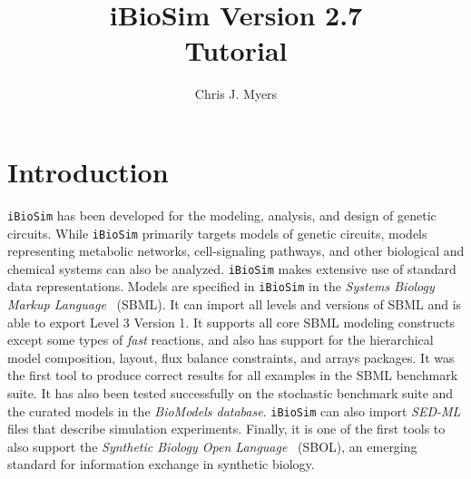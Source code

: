 \documentclass[titlepage,11pt]{article}
\title{iBioSim Version 2.7 \\ Tutorial}
\author{Chris J. Myers}
\begin{document}
\maketitle

  
\tableofcontents

\clearpage

\section{Introduction}

\noindent
{\tt iBioSim} has been developed for the modeling, analysis, and design of genetic circuits.  While {\tt iBioSim} primarily targets models of genetic circuits, models representing metabolic networks, cell-signaling pathways, and other biological and chemical systems can also be analyzed.  
{\tt iBioSim} makes extensive use of standard data representations.  Models are specified in {\tt iBioSim} in the %
\emph{Systems Biology Markup Language}
~(SBML).  It can import all levels and versions of SBML and is able to export Level 3 Version 1.  It supports all core SBML modeling constructs except some types of \emph{fast} reactions, and also has support for the hierarchical model composition, layout, flux balance constraints, and arrays packages.  It was the first tool to produce correct results for all examples in the SBML benchmark suite.  It has also been tested successfully on the stochastic benchmark suite and the curated models in the 
\emph{BioModels database}.
{\tt iBioSim} can also import 
\emph{SED-ML} files 
that describe simulation experiments.  Finally, it is one of the first tools to also support the 
\emph{Synthetic Biology Open Language}
~(SBOL), an emerging standard for information exchange in synthetic biology.
\end{document}
